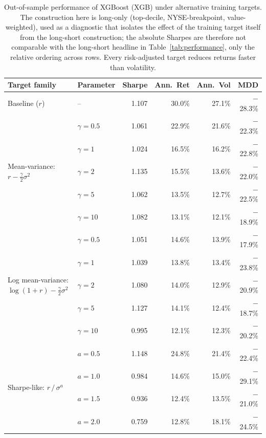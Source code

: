 \begin{table}[H]
\centering
\small
\begin{tabular}{l l r r r r}
\toprule
Target family & Parameter & Sharpe & Ann.\ Ret & Ann.\ Vol & MDD \\
\midrule
Baseline ($r$) & -- & 1.107 & 30.0\% & 27.1\% & $-$28.3\% \\
\midrule
\multirow{5}{*}{Mean-variance: $r - \frac{\gamma}{2}\sigma^2$}
 & $\gamma = 0.5$ & 1.061 & 22.9\% & 21.6\% & $-$22.3\% \\
 & $\gamma = 1$ & 1.024 & 16.5\% & 16.2\% & $-$22.8\% \\
 & $\gamma = 2$ & 1.135 & 15.5\% & 13.6\% & $-$22.0\% \\
 & $\gamma = 5$ & 1.062 & 13.5\% & 12.7\% & $-$22.5\% \\
 & $\gamma = 10$ & 1.082 & 13.1\% & 12.1\% & $-$18.9\% \\
\midrule
\multirow{5}{*}{Log mean-variance: $\log(1{+}r) - \frac{\gamma}{2}\sigma^2$}
 & $\gamma = 0.5$ & 1.051 & 14.6\% & 13.9\% & $-$17.9\% \\
 & $\gamma = 1$ & 1.039 & 13.8\% & 13.4\% & $-$23.8\% \\
 & $\gamma = 2$ & 1.080 & 14.0\% & 12.9\% & $-$20.9\% \\
 & $\gamma = 5$ & 1.127 & 14.1\% & 12.4\% & $-$18.7\% \\
 & $\gamma = 10$ & 0.995 & 12.1\% & 12.3\% & $-$20.2\% \\
\midrule
\multirow{4}{*}{Sharpe-like: $r\,/\,\sigma^a$}
 & $a = 0.5$ & 1.148 & 24.8\% & 21.4\% & $-$22.4\% \\
 & $a = 1.0$ & 0.984 & 14.6\% & 15.0\% & $-$29.1\% \\
 & $a = 1.5$ & 0.936 & 12.4\% & 13.5\% & $-$21.0\% \\
 & $a = 2.0$ & 0.759 & 12.8\% & 18.1\% & $-$24.5\% \\
\bottomrule
\end{tabular}
\caption{Out-of-sample performance of XGBoost (XGB) under alternative training targets. The construction here is long-only (top-decile, NYSE-breakpoint, value-weighted), used as a diagnostic that isolates the effect of the training target itself from the long-short construction; the absolute Sharpes are therefore not comparable with the long-short headline in Table~\ref{tab:performance}, only the relative ordering across rows. Every risk-adjusted target reduces returns faster than volatility.}
\label{tab:alt_targets}
\end{table}
